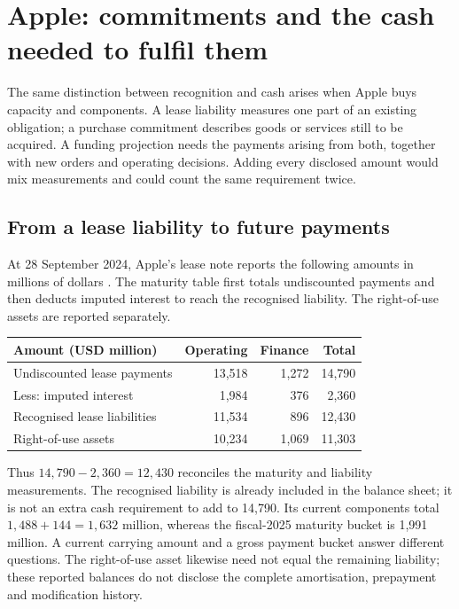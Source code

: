 \section{Apple: commitments and the cash needed to fulfil them}
\label{sec:apple-commitments}

The same distinction between recognition and cash arises when Apple buys
capacity and components. A lease liability measures one part of an existing
obligation; a purchase commitment describes goods or services still to be
acquired. A funding projection needs the payments arising from both, together
with new orders and operating decisions. Adding every disclosed amount would
mix measurements and could count the same requirement twice.

\subsection{From a lease liability to future payments}

At 28 September 2024, Apple's lease note reports the following amounts in
millions of dollars \citep[Note 8, printed p.~42]{apple2024}. The maturity table
first totals undiscounted payments and then deducts imputed interest to reach
the recognised liability. The right-of-use assets are reported separately.

\begin{center}
\begin{tabularx}{\linewidth}{@{}Xrrr@{}}
\toprule
Amount (USD million) & Operating & Finance & Total\\\midrule
Undiscounted lease payments & 13,518 & 1,272 & 14,790\\
Less: imputed interest & 1,984 & 376 & 2,360\\
Recognised lease liabilities & 11,534 & 896 & 12,430\\
Right-of-use assets & 10,234 & 1,069 & 11,303\\\bottomrule
\end{tabularx}
\end{center}

Thus $14{,}790-2{,}360=12{,}430$ reconciles the maturity and liability
measurements. The recognised liability is already included in the balance
sheet; it is not an extra cash requirement to add to 14,790. Its current
components total $1{,}488+144=1{,}632$ million, whereas the fiscal-2025 maturity
bucket is 1,991 million. A current carrying amount and a gross payment bucket
answer different questions. The right-of-use asset likewise need not equal the
remaining liability; these reported balances do not disclose the complete
amortisation, prepayment and modification history.

